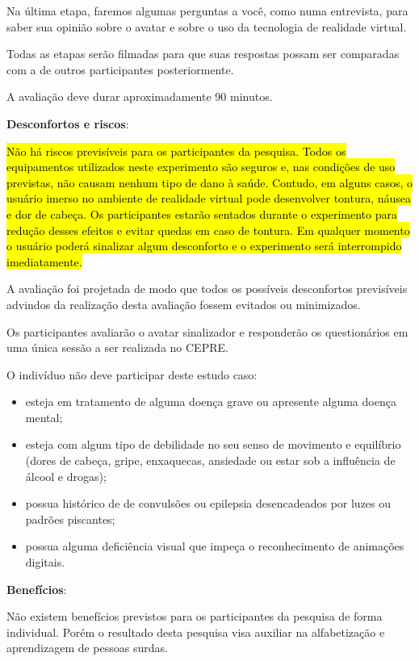 \documentclass[a4paper,11pt,titlepage,singlespacing]{article}
\begin{document}
Na última etapa, faremos algumas perguntas a você, como numa entrevista, para saber sua opinião sobre o avatar e sobre o uso da tecnologia de realidade virtual.

Todas as etapas serão filmadas para que suas respostas possam ser comparadas com a de outros participantes posteriormente.

A avaliação deve durar aproximadamente 90 minutos.

\vspace{10pt}
\textbf{Desconfortos e riscos}:

\hl{Não há riscos previsíveis para os participantes da pesquisa. Todos os equipamentos utilizados neste experimento são seguros e, nas condições de uso previstas, não causam nenhum tipo de dano à saúde. Contudo, em alguns casos, o usuário imerso no ambiente de realidade virtual pode desenvolver tontura, náusea e dor de cabeça. Os participantes estarão sentados durante o experimento para redução desses efeitos e evitar quedas em caso de tontura. Em qualquer momento o usuário poderá sinalizar algum desconforto e o experimento será interrompido imediatamente.}

A avaliação foi projetada de modo que todos os possíveis desconfortos previsíveis advindos da realização desta avaliação fossem evitados ou minimizados.

Os participantes avaliarão o avatar sinalizador e responderão os questionários em uma única sessão a ser realizada no CEPRE.

O indivíduo não deve participar deste estudo caso:

\begin{itemize}
\item esteja em tratamento de alguma doença grave ou apresente alguma doença mental;
\item esteja com algum tipo de debilidade no seu senso de movimento e equilíbrio (dores de cabeça, gripe, enxaquecas, ansiedade ou estar sob a influência de álcool e drogas);
\item possua histórico de de convulsões ou epilepsia desencadeados por luzes ou padrões piscantes;
\item possua alguma deficiência visual que impeça o reconhecimento de animações digitais.
\end{itemize}

\vspace{10pt}
\textbf{Benefícios}:

Não existem benefícios previstos para os participantes da pesquisa de forma individual. Porém o resultado desta pesquisa visa auxiliar na alfabetização e aprendizagem de pessoas surdas.
\end{document}
